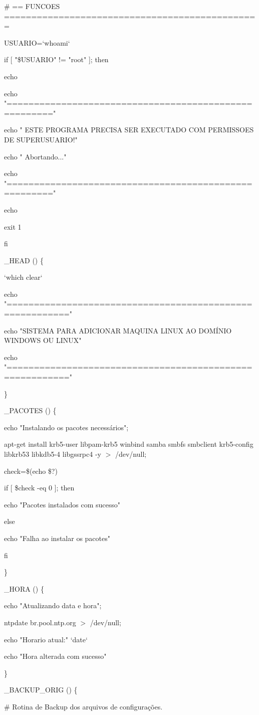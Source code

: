\# == FUNCOES ===============================================

USUARIO=`whoami`

if [ "\$USUARIO" != "root" ]; then

 	echo

  echo "======================================================"

  echo " ESTE PROGRAMA PRECISA SER EXECUTADO COM PERMISSOES DE SUPERUSUARIO!"  

  echo " Abortando..."

  echo "======================================================"

  echo

  exit 1

fi

\_HEAD () \{

`which clear`

echo "========================================================="

echo "SISTEMA PARA ADICIONAR MAQUINA LINUX AO DOMÍNIO WINDOWS OU LINUX"

echo "========================================================="

\}

\_PACOTES () \{

        echo "Instalando os pacotes necessários";       


  apt-get install krb5-user libpam-krb5 winbind samba smbfs smbclient krb5-config libkrb53 libkdb5-4 libgssrpc4 -y $>$ /dev/null;
  
      check=\$(echo \$?)

        if [ \$check -eq 0 ]; then

           echo "Pacotes instalados com sucesso"

        else

           echo "Falha ao instalar os pacotes"

        fi

\}

\_HORA () \{

        echo "Atualizando data e hora";

        ntpdate br.pool.ntp.org $>$ /dev/null;

        echo "Horario atual:" `date`

        echo "Hora alterada com sucesso"

\}

\_BACKUP\_ORIG () \{

  \# Rotina de Backup dos arquivos de configurações.

